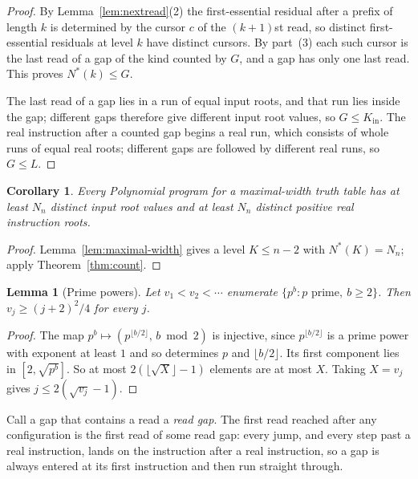 \documentclass[11pt]{article}
\newtheorem{lemma}[theorem]{Lemma}
\newtheorem{corollary}[theorem]{Corollary}
\theoremstyle{remark}
\begin{document}
\begin{proof}
By Lemma~\ref{lem:nextread}(2) the first-essential residual after a prefix
of length $k$ is determined by the cursor $c$ of the $(k+1)$st read, so
distinct first-essential residuals at level $k$ have distinct cursors.  By
part~(3) each such cursor is the last read of a gap of the kind counted by
$G$, and a gap has only one last read.  This proves $N^*(k)\le G$.

The last read of a gap lies in a run of equal input roots, and that run lies
inside the gap; different gaps therefore give different input root values,
so $G\le K_{\mathrm{in}}$.  The real instruction after a counted gap begins a real run,
which consists of whole runs of equal real roots; different gaps are
followed by different real runs, so $G\le L$.
\end{proof}

\begin{corollary}\label{cor:roots}
Every Polynomial program for a maximal-width truth table has at least $N_n$
distinct input root values and at least $N_n$ distinct positive real
instruction roots.
\end{corollary}

\begin{proof}
Lemma~\ref{lem:maximal-width} gives a level $K\le n-2$ with $N^*(K)=N_n$;
apply Theorem~\ref{thm:count}.
\end{proof}

\begin{lemma}[Prime powers]\label{lem:ppow}
Let $v_1<v_2<\cdots$ enumerate $\{p^b:p\text{ prime},\ b\ge2\}$.  Then
$v_j\ge(j+2)^2/4$ for every $j$.
\end{lemma}

\begin{proof}
The map $p^b\mapsto(p^{\lfloor b/2\rfloor},\,b\bmod2)$ is injective, since
$p^{\lfloor b/2\rfloor}$ is a prime power with exponent at least $1$ and so
determines $p$ and $\lfloor b/2\rfloor$.  Its first component lies in
$[2,\sqrt{p^b}]$.  So at most $2(\lfloor\sqrt X\rfloor-1)$ elements are at
most $X$.  Taking $X=v_j$ gives $j\le2(\sqrt{v_j}-1)$.
\end{proof}

Call a gap that contains a read a \emph{read gap}.  The first read reached
after any configuration is the first read of some read gap: every jump, and
every step past a real instruction, lands on the instruction after a real
instruction, so a gap is always entered at its first instruction and then
run straight through.
\end{document}
